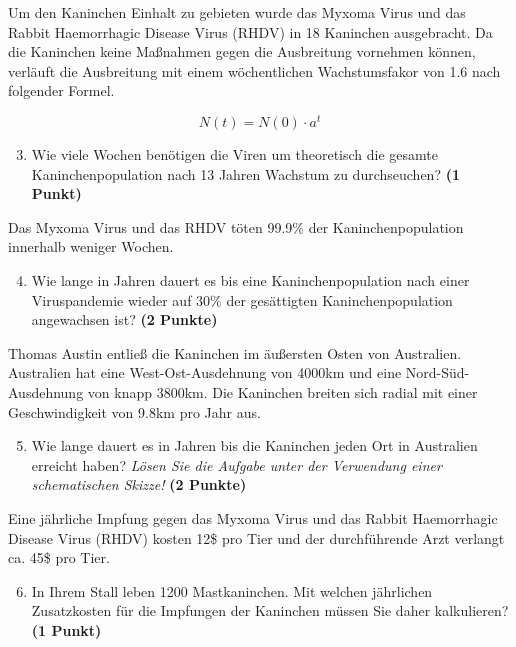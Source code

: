 \documentclass[a4paper, 9pt]{scrartcl}\usepackage[]{graphicx}\usepackage[]{xcolor}
\begin{document}
Um den Kaninchen Einhalt zu gebieten wurde das Myxoma Virus und das Rabbit
Haemorrhagic Disease Virus (RHDV) in 18 Kaninchen
ausgebracht. Da die Kaninchen keine Ma{\ss}nahmen gegen die Ausbreitung
vornehmen k{\"o}nnen, verl{\"a}uft die Ausbreitung mit einem w{\"o}chentlichen
Wachstumsfakor von 1.6 nach folgender Formel.

\begin{equation*}
  N(t) = N(0) \cdot a^t
\end{equation*}

\begin{enumerate}
  \setcounter{enumi}{2}
\item Wie viele Wochen ben{\"o}tigen die Viren um theoretisch die gesamte
  Kaninchenpopulation nach 13 Jahren Wachstum zu
  durchseuchen? \textbf{(1 Punkt)}
\end{enumerate}

Das Myxoma Virus und das RHDV t{\"o}ten 99.9\% der
Kaninchenpopulation innerhalb weniger Wochen.

\begin{enumerate}
  \setcounter{enumi}{3}  
\item Wie lange in Jahren dauert es bis eine Kaninchenpopulation nach einer
  Viruspandemie wieder auf 30\% der ges{\"a}ttigten
  Kaninchenpopulation angewachsen ist?  \textbf{(2 Punkte)}
\end{enumerate}

Thomas Austin entlie{\ss} die Kaninchen im {\"a}u{\ss}ersten Osten von
Australien. Australien hat eine West-Ost-Ausdehnung von 4000km
und eine Nord-S{\"u}d-Ausdehnung von knapp 3800km. Die Kaninchen
breiten sich radial mit einer Geschwindigkeit von 9.8km pro
Jahr aus.

\begin{enumerate}
  \setcounter{enumi}{4}
\item Wie lange dauert es in Jahren bis die Kaninchen jeden Ort
  in Australien erreicht haben? \textit{L{\"o}sen Sie die Aufgabe unter der
    Verwendung einer schematischen Skizze!} \textbf{(2 Punkte)}
\end{enumerate}

Eine j{\"a}hrliche Impfung gegen das Myxoma Virus und das Rabbit Haemorrhagic
Disease Virus (RHDV) kosten 12\$ pro Tier und der
durchf{\"u}hrende Arzt verlangt ca. 45\$ pro Tier.

\begin{enumerate}
  \setcounter{enumi}{5}
\item In Ihrem Stall leben 1200 Mastkaninchen. Mit welchen
  j{\"a}hrlichen Zusatzkosten f{\"u}r die Impfungen der Kaninchen m{\"u}ssen Sie daher
  kalkulieren? \textbf{(1 Punkt)}
\end{enumerate}
 
\end{document}
